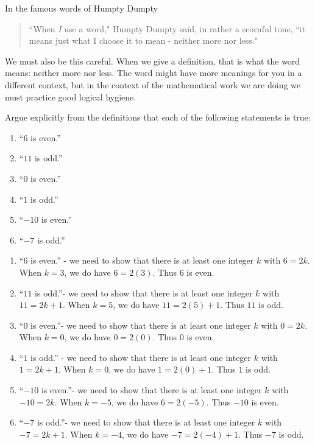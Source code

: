 In the famous words of Humpty Dumpty \cite{SV}

\begin{quote}
	``When \textit{I} use a word," Humpty Dumpty said, in rather a scornful tone, ``it means just what I choose it to mean - neither more nor less."
\end{quote}

We must also be this careful. When we give a definition, that is what the word means:  neither more nor less.  The word might have more meanings for you in a different context, but in the context of the mathematical work we are doing we must practice good logical hygiene.

\begin{xca}
	Argue explicitly from the definitions that each of the following statements is true:
	
	\begin{enumerate}
			\item ``$6$ is even.''
			\item ``$11$ is odd.''
			\item ``$0$ is even.''
			\item ``$1$ is odd.''
			\item ``$-10$ is even.''
			\item ``$-7$ is odd.''
		\end{enumerate}
	\end{xca}

\begin{solutions}
	
	\begin{enumerate}
		\item ``$6$ is even.'' - we need to show that there is at least one integer $k$ with $6 = 2k$.  When $k = 3$, we do have $6 = 2(3)$.  Thus $6$ is even.
		\item ``$11$ is odd.''- we need to show that there is at least one integer $k$ with $11 = 2k+1$.  When $k = 5$, we do have $11 = 2(5)+1$.  Thus $11$ is odd.
		\item ``$0$ is even.''- we need to show that there is at least one integer $k$ with $0 = 2k$.  When $k = 0$, we do have $0 = 2(0)$.  Thus $0$ is even.
		\item ``$1$ is odd.'' - we need to show that there is at least one integer $k$ with $1 = 2k+1$.  When $k = 0$, we do have $1 = 2(0)+1$.  Thus $1$ is odd.
		\item ``$-10$ is even.''- we need to show that there is at least one integer $k$ with $-10 = 2k$.  When $k = -5$, we do have $6 = 2(-5)$.  Thus $-10$ is even.
		\item ``$-7$ is odd.''- we need to show that there is at least one integer $k$ with $-7 = 2k+1$.  When $k = -4$, we do have $-7 = 2(-4)+1$.  Thus $-7$ is odd.
	\end{enumerate}

\end{solutions}

